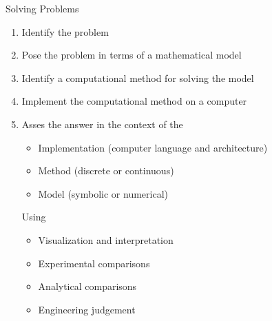 \documentclass[xcolor=x11names,compress]{beamer}
\renewcommand{\(}{\begin{columns}}
\renewcommand{\)}{\end{columns}}
\newcommand{\<}[1]{\begin{column}{#1}}
\renewcommand{\>}{\end{column}}
\begin{document}
\begin{frame}{Solving Problems}
\begin{enumerate}
\item Identify the problem
\item Pose the problem in terms of a mathematical model
\item Identify a computational method for solving the model
\item Implement the computational method on a computer
\item Asses the answer in the context of the
\begin{itemize}
\item Implementation (computer language and architecture)
\item Method (discrete or continuous)
\item Model (symbolic or numerical)
\end{itemize}
Using
\begin{itemize}
\item Visualization and interpretation
\item Experimental comparisons
\item Analytical comparisons
\item Engineering judgement
\end{itemize}
\end{enumerate}
\end{frame}
\end{document}
